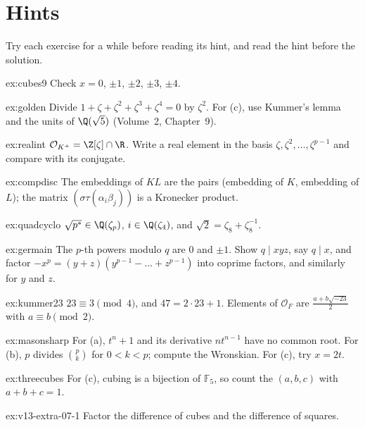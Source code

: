 \section{Hints}

Try each exercise for a while before reading its hint, and read the hint before the solution.

\begin{hint}{ex:cubes9}
Check $x=0$, $\pm1$, $\pm2$, $\pm3$, $\pm4$.
\end{hint}
\begin{hint}{ex:golden}
Divide $1+\zeta+\zeta^2+\zeta^3+\zeta^4=0$ by $\zeta^2$. For (c), use Kummer's lemma and the units of $\Q(\sqrt5)$ (Volume~2,
Chapter~9).
\end{hint}
\begin{hint}{ex:realint}
$\mathcal O_{K^+}=\Z[\zeta]\cap\R$. Write a real element in the basis $\zeta,\zeta^2,\dots,\zeta^{p-1}$ and compare with its
conjugate.
\end{hint}
\begin{hint}{ex:compdisc}
The embeddings of $KL$ are the pairs (embedding of $K$, embedding of $L$); the matrix $(\sigma\tau(\alpha_i\beta_j))$ is a
Kronecker product.
\end{hint}
\begin{hint}{ex:quadcyclo}
$\sqrt{p^*}\in\Q(\zeta_p)$, $i\in\Q(\zeta_4)$, and $\sqrt2=\zeta_8+\zeta_8^{-1}$.
\end{hint}
\begin{hint}{ex:germain}
The $p$-th powers modulo $q$ are $0$ and $\pm1$. Show $q\mid xyz$, say $q\mid x$, and factor $-x^p=(y+z)(y^{p-1}-\dots+z^{p-1})$
into coprime factors, and similarly for $y$ and $z$.
\end{hint}
\begin{hint}{ex:kummer23}
$23\equiv3\pmod4$, and $47=2\cdot23+1$. Elements of $\mathcal O_F$ are $\frac{a+b\sqrt{-23}}2$ with $a\equiv b\pmod2$.
\end{hint}
\begin{hint}{ex:masonsharp}
For (a), $t^n+1$ and its derivative $nt^{n-1}$ have no common root. For (b), $p$ divides $\binom pk$ for $0<k<p$; compute
the Wronskian. For (c), try $x=2t$.
\end{hint}
\begin{hint}{ex:threecubes}
For (c), cubing is a bijection of $\mathbb F_5$, so count the $(a,b,c)$ with $a+b+c=1$.
\end{hint}

\begin{hint}{ex:v13-extra-07-1}
Factor the difference of cubes and the difference of squares.
\end{hint}

